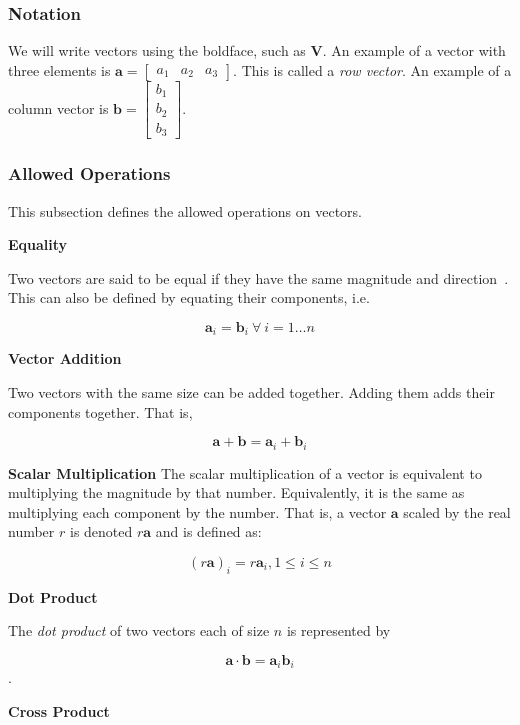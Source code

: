 \documentclass[12pt]{article}
\begin{document}
\subsubsection{Notation}
We will write vectors using the boldface, such as $\mathbf{V}$. An example of a vector with 
three elements is $\mathbf{a} = \begin{bmatrix}a_1 & a_2 & a_3 \end{bmatrix}$. This is
called a \textit{row vector}. An example of a column vector is $\mathbf{b} = 
\begin{bmatrix}b_1 \\ b_2 \\ b_3 \end{bmatrix}$.

\subsubsection{Allowed Operations} 

This subsection defines the allowed operations on vectors.

\noindent \textbf{Equality}

Two vectors are said to be equal if they have the same magnitude and 
direction~\citep{Wikipedia_EuclidVectors_2025}. This can also be defined by
equating their components, i.e. 

$$\mathbf{a}_i = \mathbf{b}_i\ \forall~i = 1\ldots n$$

\noindent\textbf{Vector Addition}

\noindent Two vectors with the same size can be added together. Adding them adds their
components together. That is,

$$\mathbf{a} + \mathbf{b} = \mathbf{a}_i + \mathbf{b}_i$$

\noindent\textbf{Scalar Multiplication}
The scalar multiplication of a vector is equivalent to multiplying the magnitude
by that number. Equivalently, it is the same as multiplying each component by the
number. That is, a vector $\mathbf{a}$ scaled by the real number $r$ is denoted
$r\mathbf{a}$ and is defined as:

$$(r\mathbf{a})_i = r\mathbf{a}_i, 1 \leq i \leq n$$

\noindent \textbf{Dot Product}

The \textit{dot product} of two vectors each of size $n$ is represented by

$$\mathbf{a} \cdot \mathbf{b} = \mathbf{a}_i\mathbf{b}_i$$.

\noindent \textbf{Cross Product}
\end{document}
